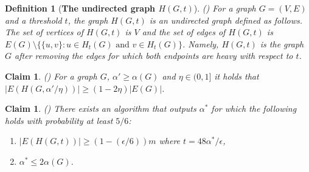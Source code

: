 \documentclass{article}
\newcommand{\eps}{\epsilon}
\newenvironment{proof}{\smallskip\noindent{\bf Proof:}}%
        {\hspace*{\fill}$\Box$\par}
\newtheorem{claim}[lemma]{Claim}
\newtheorem{definition}{Definition}
\begin{document}
\begin{definition}[\bf The undirected graph $H(G, t)$](\cite{})
For a graph $G = (V, E)$ and a threshold $t$, the graph $H(G, t)$ is an undirected graph defined as follows.
The set of vertices of $H(G, t)$ is $V$ and the set of edges of $H(G, t)$ is $E(G)\setminus \{\{u, v\} : u\in H_t(G) \text{ and } v \in H_t(G)\}$.
Namely, $H(G, t)$ is the graph $G$ after removing the edges for which both endpoints are heavy with respect to $t$.
\end{definition}

\begin{claim}\label{clm:arb}(\cite{})
For a graph $G$, $\alpha' \geq \alpha(G)$ and $\eta\in (0,1]$ it holds that $|E(H(G, \alpha'/\eta))| \geq (1-2\eta)|E(G)|$.
\end{claim}


\begin{claim}\label{lem:alpha}(\cite{})
There exists an algorithm that outputs $\alpha^*$ for which the following holds with probability at least $5/6$:
\begin{enumerate}
\item $|E(H(G, t))| \geq (1-(\eps/6))m$ where $t = 48\alpha^*/\epsilon$,
\item $\alpha^* \leq 2 \alpha(G)$.
\end{enumerate}
\end{claim}
\fi

\end{document}
